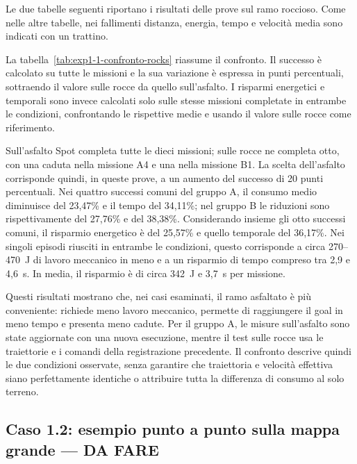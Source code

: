 \documentclass[11pt,a4paper]{article}
\begin{document}
Le due tabelle seguenti riportano i risultati delle prove sul ramo roccioso. Come nelle altre tabelle, nei fallimenti distanza, energia, tempo e velocità media sono indicati con un trattino.



La tabella~\ref{tab:exp1-1-confronto-rocks} riassume il confronto. Il successo è calcolato su tutte le missioni e la sua variazione è espressa in punti percentuali, sottraendo il valore sulle rocce da quello sull'asfalto. I risparmi energetici e temporali sono invece calcolati solo sulle stesse missioni completate in entrambe le condizioni, confrontando le rispettive medie e usando il valore sulle rocce come riferimento.



Sull'asfalto Spot completa tutte le dieci missioni; sulle rocce ne completa otto, con una caduta nella missione A4 e una nella missione B1. La scelta dell'asfalto corrisponde quindi, in queste prove, a un aumento del successo di 20 punti percentuali. Nei quattro successi comuni del gruppo A, il consumo medio diminuisce del 23,47\% e il tempo del 34,11\%; nel gruppo B le riduzioni sono rispettivamente del 27,76\% e del 38,38\%. Considerando insieme gli otto successi comuni, il risparmio energetico è del 25,57\% e quello temporale del 36,17\%. Nei singoli episodi riusciti in entrambe le condizioni, questo corrisponde a circa 270--470~J di lavoro meccanico in meno e a un risparmio di tempo compreso tra 2,9 e 4,6~s. In media, il risparmio è di circa 342~J e 3,7~s per missione.

Questi risultati mostrano che, nei casi esaminati, il ramo asfaltato è più conveniente: richiede meno lavoro meccanico, permette di raggiungere il goal in meno tempo e presenta meno cadute. Per il gruppo A, le misure sull'asfalto sono state aggiornate con una nuova esecuzione, mentre il test sulle rocce usa le traiettorie e i comandi della registrazione precedente. Il confronto descrive quindi le due condizioni osservate, senza garantire che traiettoria e velocità effettiva siano perfettamente identiche o attribuire tutta la differenza di consumo al solo terreno.

\clearpage
\subsection{Caso 1.2: esempio punto a punto sulla mappa grande --- DA FARE}
\label{sec:risultati-caso-1-2}
\end{document}
